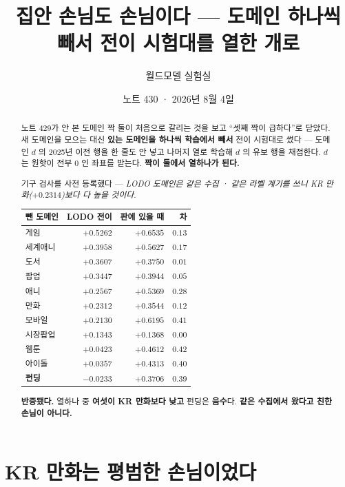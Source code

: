 \documentclass[11pt]{article}
\begin{document}
\title{집안 손님도 손님이다 --- 도메인 하나씩 빼서 전이 시험대를 열한 개로}
\author{월드모델 실험실}
\date{노트 430 · 2026년 8월 4일}
\maketitle

\begin{abstract}
노트 429가 안 본 도메인 짝 둘이 처음으로 갈리는 것을 보고 ``셋째 짝이
급하다''로 닫았다. 새 도메인을 모으는 대신 \textbf{있는 도메인을 하나씩
학습에서 빼서} 전이 시험대로 썼다 --- 도메인 $d$ 의 2025년 이전 행을 한 줄도
안 넣고 나머지 열로 학습해 $d$ 의 유보 행을 채점한다. $d$ 는 원핫이 전부 0 인
좌표를 받는다. \textbf{짝이 둘에서 열하나가 된다.}

기구 검사를 사전 등록했다 --- \emph{LODO 도메인은 같은 수집 · 같은 라벨
계기를 쓰니 KR 만화($+0.2314$)보다 다 높을 것이다.}

\begin{center}
\begin{tabular}{lrrr}
\hline
뺀 도메인 & LODO 전이 & 판에 있을 때 & 차 \\
\hline
게임 & $+0.5262$ & $+0.6535$ & $0.13$ \\
세계애니 & $+0.3958$ & $+0.5627$ & $0.17$ \\
도서 & $+0.3607$ & $+0.3750$ & $0.01$ \\
팝업 & $+0.3447$ & $+0.3944$ & $0.05$ \\
애니 & $+0.2567$ & $+0.5369$ & $0.28$ \\
만화 & $+0.2312$ & $+0.3544$ & $0.12$ \\
모바일 & $+0.2130$ & $+0.6195$ & $0.41$ \\
시장팝업 & $+0.1343$ & $+0.1368$ & $\mathbf{0.00}$ \\
웹툰 & $+0.0423$ & $+0.4612$ & $\mathbf{0.42}$ \\
아이돌 & $+0.0357$ & $+0.4313$ & $0.40$ \\
\textbf{펀딩} & $\mathbf{-0.0233}$ & $+0.3706$ & $0.39$ \\
\hline
\end{tabular}
\end{center}

\textbf{반증됐다.} 열하나 중 \textbf{여섯이 KR 만화보다 낮고} 펀딩은
\textbf{음수}다. \textbf{같은 수집에서 왔다고 친한 손님이 아니다.}
\end{abstract}

\section{KR 만화는 평범한 손님이었다}
\end{document}
